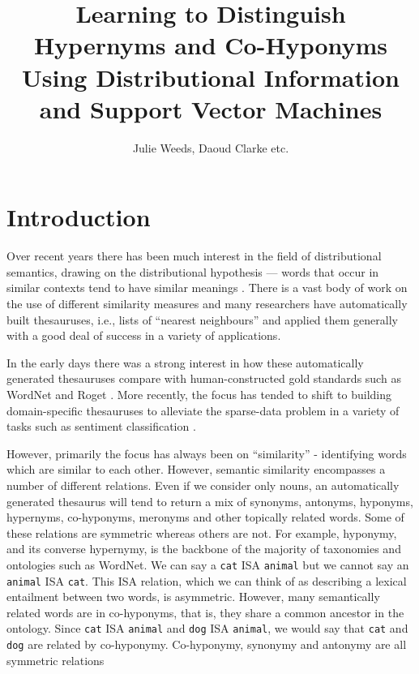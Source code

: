 \documentclass[11pt]{article}
\title{Learning to Distinguish Hypernyms and Co-Hyponyms Using Distributional Information and Support Vector Machines}
\author{Julie Weeds, Daoud Clarke etc.}
\date{} %
\begin{document}
\maketitle

\begin{abstract}
\end{abstract}
\section{Introduction}

Over recent years there has been much interest in the field of distributional semantics, drawing on the distributional hypothesis ---  words that occur in similar contexts tend to have similar meanings \cite{Harris1954}.   There is a vast body of work on the use of different similarity measures \cite{Lee1999,Weeds2003,Curran2004} and many researchers have automatically built thesauruses, i.e., lists of ``nearest neighbours'' and applied them generally with a good deal of success in a variety of applications.

In the early days there was a strong interest in how these automatically generated thesauruses compare with human-constructed gold standards such as WordNet and Roget \cite{Lin1998,Kilgarriff2000}.  More recently, the focus has tended to shift to building domain-specific thesauruses to alleviate the sparse-data problem in a variety of tasks such as sentiment classification \cite{Bollegala2011}.  

However, primarily the focus has always been on ``similarity'' - identifying words which are similar to each other. However, semantic similarity encompasses a number of different relations.  Even if we consider only nouns, an automatically generated thesaurus will tend to return a mix of synonyms, antonyms, hyponyms, hypernyms, co-hyponyms, meronyms and other topically related words.  Some of these relations are symmetric whereas others are not.  For example, hyponymy, and its converse hypernymy, is the backbone of the majority of taxonomies and ontologies such as WordNet.  We can say a \texttt{cat} ISA \texttt{animal}  but we cannot say an \texttt{animal} ISA \texttt{cat}.  This ISA relation, which we can think of  as describing a lexical entailment\cite{Geffet2005}  between two words, is asymmetric.  However, many semantically related words are in co-hyponyms, that is, they share a common ancestor in the ontology.  Since \texttt{cat} ISA \texttt{animal} and \texttt{dog} ISA \texttt{animal}, we would say that \texttt{cat} and \texttt{dog} are related by co-hyponymy.  Co-hyponymy, synonymy and antonymy are all symmetric relations 
\end{document}
